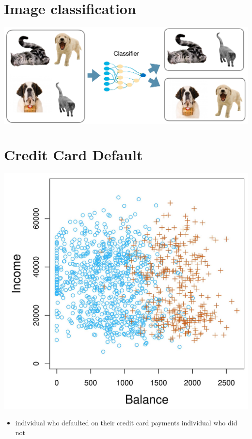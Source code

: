 \documentclass[10pt]{article}
\begin{document}
\section*{Image classification}
\begin{center}
\includegraphics[max width=\textwidth]{2023_12_30_cf784c471dfd1dd5afbag-05}
\end{center}

\section*{Credit Card Default}
\begin{center}
\includegraphics[max width=\textwidth]{2023_12_30_cf784c471dfd1dd5afbag-06}
\end{center}

\begin{itemize}
  \item individual who defaulted on their credit card payments individual who did not
\end{itemize}
\end{document}
